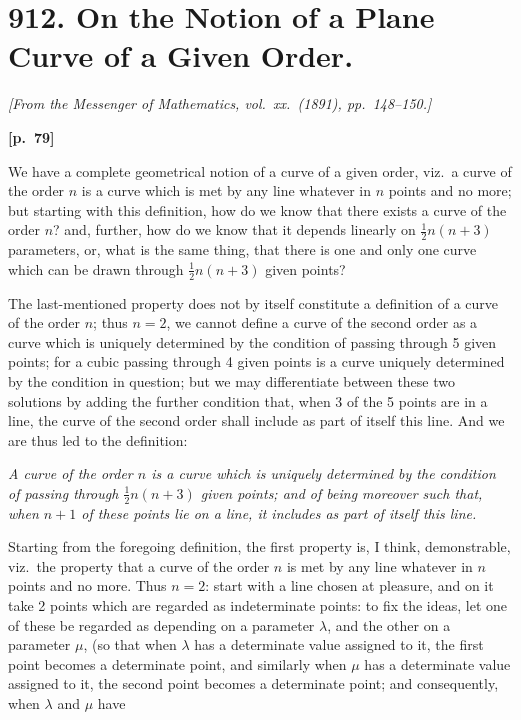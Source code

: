 \documentclass[11pt,a4paper]{book}
\begin{document}
\newpage

\section*{912. On the Notion of a Plane Curve of a Given Order.}

\noindent\textit{[From the Messenger of Mathematics, vol.\ xx.\ (1891), pp.\ 148--150.]}

\vspace{0.5em}
\noindent\textbf{[p.\ 79]}

We have a complete geometrical notion of a curve of a given order, viz.\ a curve of the order $n$ is a curve which is met by any line whatever in $n$ points and no more; but starting with this definition, how do we know that there exists a curve of the order $n$? and, further, how do we know that it depends linearly on $\frac{1}{2}n(n + 3)$ parameters, or, what is the same thing, that there is one and only one curve which can be drawn through $\frac{1}{2}n(n + 3)$ given points?

The last-mentioned property does not by itself constitute a definition of a curve of the order $n$; thus $n = 2$, we cannot define a curve of the second order as a curve which is uniquely determined by the condition of passing through 5 given points; for a cubic passing through 4 given points is a curve uniquely determined by the condition in question; but we may differentiate between these two solutions by adding the further condition that, when 3 of the 5 points are in a line, the curve of the second order shall include as part of itself this line. And we are thus led to the definition:

\smallskip
\textit{A curve of the order $n$ is a curve which is uniquely determined by the condition of passing through $\frac{1}{2}n(n + 3)$ given points; and of being moreover such that, when $n + 1$ of these points lie on a line, it includes as part of itself this line.}
\smallskip

Starting from the foregoing definition, the first property is, I think, demonstrable, viz.\ the property that a curve of the order $n$ is met by any line whatever in $n$ points and no more. Thus $n = 2$: start with a line chosen at pleasure, and on it take 2 points which are regarded as indeterminate points: to fix the ideas, let one of these be regarded as depending on a parameter $\lambda$, and the other on a parameter $\mu$, (so that when $\lambda$ has a determinate value assigned to it, the first point becomes a determinate point, and similarly when $\mu$ has a determinate value assigned to it, the second point becomes a determinate point; and consequently, when $\lambda$ and $\mu$ have
\end{document}
